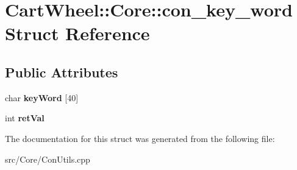 \hypertarget{structCartWheel_1_1Core_1_1con__key__word}{
\section{CartWheel::Core::con\_\-key\_\-word Struct Reference}
\label{structCartWheel_1_1Core_1_1con__key__word}
}
\subsection*{Public Attributes}
\begin{DoxyCompactItemize}
\item 
\hypertarget{structCartWheel_1_1Core_1_1con__key__word_a8a53b82cf9f0dff6e91bb27fb3e9b6e8}{
char {\bfseries keyWord} \mbox{[}40\mbox{]}}
\label{structCartWheel_1_1Core_1_1con__key__word_a8a53b82cf9f0dff6e91bb27fb3e9b6e8}

\item 
\hypertarget{structCartWheel_1_1Core_1_1con__key__word_af0f6bec54c64adf33673114afe179b55}{
int {\bfseries retVal}}
\label{structCartWheel_1_1Core_1_1con__key__word_af0f6bec54c64adf33673114afe179b55}

\end{DoxyCompactItemize}


The documentation for this struct was generated from the following file:\begin{DoxyCompactItemize}
\item 
src/Core/ConUtils.cpp\end{DoxyCompactItemize}
